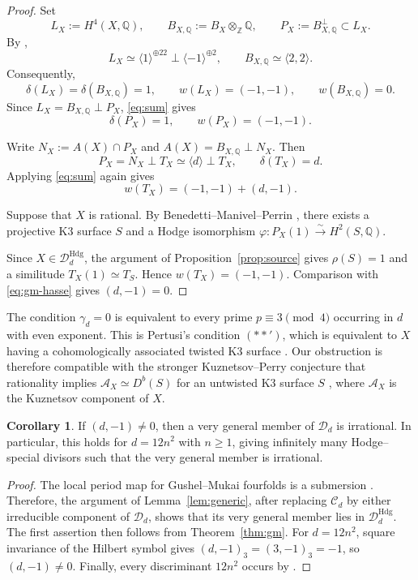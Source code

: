 \documentclass[10pt]{amsart}
\numberwithin{equation}{section}
\theoremstyle{definition}
\newtheorem{corollary}[theorem]{Corollary}
\theoremstyle{plain}
\numberwithin{theorem}{section}
\newcommand{\Q}{\mathbb{Q}}
\newcommand{\Z}{\mathbb{Z}}
\begin{document}
\begin{proof}
Set
\[
L_X:=H^4(X,\Q),
\qquad
B_{X,\Q}:=B_X\otimes_{\Z}\Q,
\qquad
P_X:=B_{X,\Q}^{\perp}\subset L_X.
\]
By \cite[\S5.1]{debarre2015special},
\[
L_X\simeq
\langle1\rangle^{\oplus22}\perp\langle-1\rangle^{\oplus2},
\qquad
B_{X,\Q}\simeq\langle2,2\rangle.
\]
Consequently,
\[
\delta(L_X)=\delta(B_{X,\Q})=1,
\qquad
w(L_X)=(-1,-1),
\qquad
w(B_{X,\Q})=0.
\]
Since $L_X=B_{X,\Q}\perp P_X$, 
\eqref{eq:sum} gives
\[
\delta(P_X)=1,
\qquad
w(P_X)=(-1,-1).
\]

Write $N_X:=A(X)\cap P_X$ and $A(X)=B_{X,\Q}\perp N_X$. Then
\[
P_X=N_X\perp T_X\simeq\langle d\rangle\perp T_X,
\qquad
\delta(T_X)=d.
\]
Applying \eqref{eq:sum} again  gives
\begin{equation}\label{eq:gm-hasse}
w(T_X)=(-1,-1)+(d,-1).
\end{equation}

Suppose that $X$ is rational. By Benedetti--Manivel--Perrin
\cite[Theorem~13]{benedetti2026quantumcohomologyirrationalitygushelmukai}, 
there exists a projective K3 surface $S$ and a Hodge isomorphism
$\varphi\colon P_X(1)\xrightarrow{\sim}H^2(S,\Q).$

Since $X\in\mathcal D_d^{\mathrm{Hdg}}$, the argument of
Proposition~\ref{prop:source} gives $\rho(S)=1$ and a similitude
$T_X(1)\simeq T_S$. Hence $w(T_X)=(-1,-1)$. Comparison with \eqref{eq:gm-hasse} gives
$(d,-1)=0$.
\end{proof}

The condition $\gamma_d=0$ is equivalent to every prime
$p\equiv3\pmod4$ occurring in $d$ with even exponent. This is
Pertusi's condition $(**')$, which is equivalent to $X$ having a
cohomologically associated twisted K3 surface
\cite[Theorem~1.1]{pertusi2019double}. Our obstruction is therefore
compatible with the stronger Kuznetsov--Perry conjecture that
rationality implies $\mathcal A_X\simeq D^b(S)$ for an untwisted
K3 surface $S$ \cite[Conjecture~3.12]{Kuznetsov2016DerivedCO}, where $\mathcal A_X$ is the Kuznetsov component of $X$.

\begin{corollary}\label{cor:inf}
If $(d,-1)\neq0$, then a very general member of $\mathcal D_d$ is irrational. In particular, this holds
for $d=12n^2$ with $n\geq1$, giving infinitely many Hodge--special
divisors such that the very general member is irrational.
\end{corollary}

\begin{proof}
The local period map for Gushel--Mukai fourfolds is a submersion
\cite[Theorem~4.4]{debarre2015special}. Therefore, the argument of
Lemma~\ref{lem:generic}, after replacing $\mathcal C_d$ by either irreducible
component of $\mathcal D_d$, shows that its very general member lies in
$\mathcal D_d^{\mathrm{Hdg}}$. The first assertion then follows from
Theorem~\ref{thm:gm}. For $d=12n^2$, square invariance of the Hilbert symbol gives $(d,-1)_3=(3,-1)_3=-1$,
so $(d,-1)\neq0$. Finally, every discriminant $12n^2$ occurs by
\cite[Theorem~8.1]{debarre2015special}.
\end{proof}
\end{document}

